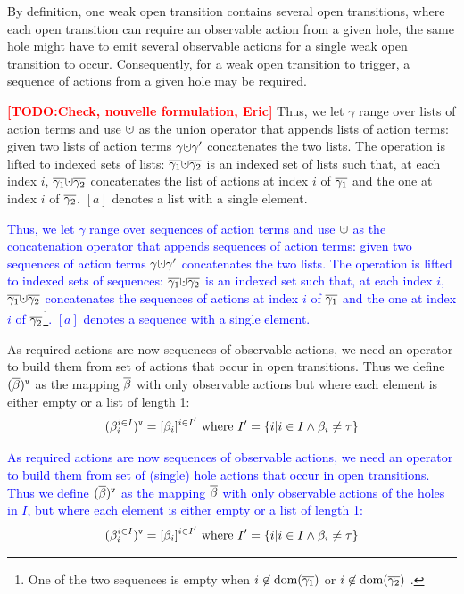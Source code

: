 \documentclass{lmcs}
\newcommand{\TODO}[1]{\textcolor{red}{\textbf{[TODO:#1]}}}
\newcommand{\ERIC}[1]{\textcolor{blue}{#1}}
\begin{document}
By definition, one weak open transition contains  several open transitions, where  each open transition can require an observable action from a given hole, the same hole might have to emit several observable actions for a single weak open transition to occur. 
Consequently, for a weak open transition to trigger, a sequence of actions from a given hole may be required.

\TODO{Check, nouvelle formulation, Eric}
Thus, we let $\gamma$ range over lists of action terms and use $\dotcup$ as the union operator that appends lists of action terms: given two  lists of action terms  $\gamma\dotcup\gamma '$ concatenates the two lists. The operation is lifted to indexed sets of lists:  $\set {\gamma_1}\dotcup \set {\gamma_2}$ is an indexed set of lists such that, at each index $i$, $\set {\gamma_1}\dotcup \set {\gamma_2}$ concatenates the list of  actions at index $i$ of $\overline{\gamma_1}$ and the one at index $i$ of $\overline{\gamma_2}$. $[a]$ denotes a list with a single element.

\ERIC{Thus, we let $\gamma$ range over sequences of action terms and use $\dotcup$ as the concatenation operator that appends sequences of action terms: given two sequences of action terms  $\gamma\dotcup\gamma '$ concatenates the two lists. The operation is lifted to indexed sets of sequences:  $\set {\gamma_1}\dotcup \set {\gamma_2}$ is an indexed set such that, at each index $i$, $\set {\gamma_1}\dotcup \set {\gamma_2}$ concatenates the sequences of actions at index $i$ of $\overline{\gamma_1}$ and the one at index $i$ of $\overline{\gamma_2}$\footnote{One of the two sequences is empty when $i\not \in \operatorname{dom}(\overline{\gamma_1})$ or $i\not \in \operatorname{dom}(\overline{\gamma_2})$ .}. $[a]$ denotes a sequence with a single element.}

As required actions are now sequences of observable actions, we need an operator to build them from set of actions that occur in open transitions.
Thus we define $(\overline{\beta})^{\tt v}$ as the mapping $\overline{\beta}$  with only observable actions but where each element is either empty or a list of length 1:
 \[(\beta_i^{i\in I})^{\tt v} = [\beta_i]^{i\in I'}\text{ where }I'=\left\{i| i\in I \land \beta_i\neq \tau\right\}\]

\ERIC{As required actions are now sequences of observable actions, we need an operator to build them from set of (single) hole actions that occur in open transitions.
Thus we define $(\overline{\beta})^{\tt v}$ as the mapping $\overline{\beta}$  with only observable actions of the holes in $I$, but where each element is either empty or a list of length 1:
 \[(\beta_i^{i\in I})^{\tt v} = [\beta_i]^{i\in I'}\text{ where }I'=\left\{i| i\in I \land \beta_i\neq \tau\right\}\]}
\end{document}
